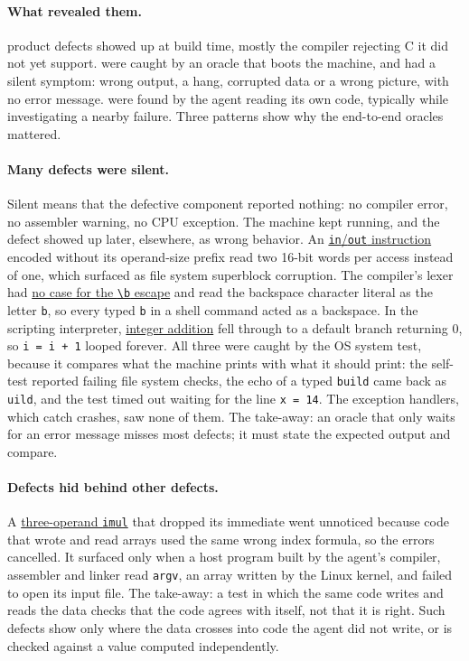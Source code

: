 \documentclass{article}
\newcommand{\defect}[2]{\href{\siteurl/defects.html\##1}{#2}}
\begin{document}
\paragraph{What revealed them.} \ntbuildrevealed{} product defects showed up at build
time, mostly the compiler rejecting C it did not yet support. \ntbootrevealed{} were
caught by an oracle that boots the machine, and \ntsilent{} had a silent symptom: wrong
output, a hang, corrupted data or a wrong picture, with no error message. \ntcodereading{}
were found by the agent reading its own code, typically while investigating a nearby
failure. Three patterns show why the end-to-end oracles mattered.

\paragraph{Many defects were silent.} Silent means that the defective component reported
nothing: no compiler error, no assembler warning, no CPU exception. The machine kept
running, and the defect showed up later, elsewhere, as wrong behavior. An
\defect{D-C06-04}{\texttt{in}/\texttt{out} instruction} encoded without its operand-size
prefix read two 16-bit words per access instead of one, which surfaced as file system
superblock corruption. The compiler's lexer had \defect{D-C06-13}{no case for the
\texttt{\textbackslash b} escape} and read the backspace character literal as the letter
\texttt{b}, so every typed \texttt{b} in a shell command acted as a backspace. In the
scripting interpreter, \defect{D-C01-08}{integer addition} fell through to a default
branch returning 0, so \texttt{i = i + 1} looped forever. All three were caught by the OS
system test, because it compares what the machine prints with what it should print: the
self-test reported failing file system checks, the echo of a typed \texttt{build} came back
as \texttt{uild}, and the test timed out waiting for the line \texttt{x = 14}. The
exception handlers, which catch crashes, saw none of them. The take-away: an oracle that
only waits for an error message misses most defects; it must state the expected output and
compare.

\paragraph{Defects hid behind other defects.} A \defect{D-C04-12}{three-operand
\texttt{imul}} that dropped its immediate went unnoticed because code that wrote and read arrays used the same wrong
index formula, so the errors cancelled. It surfaced only when a host program built by the agent's
compiler, assembler and linker read \texttt{argv}, an array written by the Linux kernel, and
failed to open its input file. The take-away: a test in which the same code writes and
reads the data checks that the code agrees with itself, not that it is right. Such
defects show only where the data crosses into code the agent did not write, or is checked
against a value computed independently.
\end{document}
